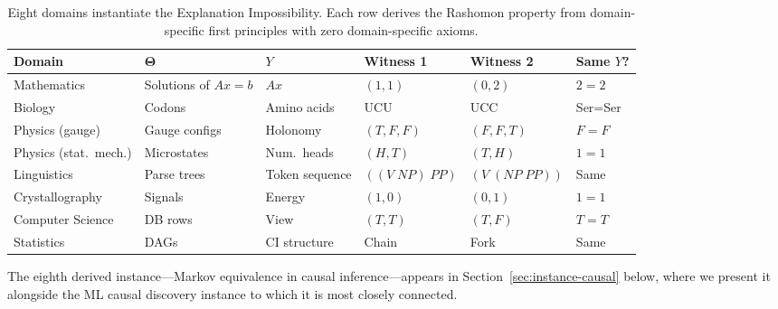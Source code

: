 \documentclass[11pt,a4paper]{article}
\newcommand{\Params}{\mathbf{\Theta}}
\begin{document}
\begin{table}[t]
\centering
\caption{Eight domains instantiate the Explanation Impossibility. Each row derives the Rashomon property from domain-specific first principles with zero domain-specific axioms.}
\label{tab:unification}
\begin{tabular}{llllll}
\toprule
Domain & $\Params$ & $Y$ & Witness 1 & Witness 2 & Same $Y$? \\
\midrule
Mathematics & Solutions of $Ax=b$ & $Ax$ & $(1,1)$ & $(0,2)$ & $2=2$ \\
Biology & Codons & Amino acids & UCU & UCC & Ser=Ser \\
Physics (gauge) & Gauge configs & Holonomy & $(T,F,F)$ & $(F,F,T)$ & $F=F$ \\
Physics (stat.\ mech.) & Microstates & Num.\ heads & $(H,T)$ & $(T,H)$ & $1=1$ \\
Linguistics & Parse trees & Token sequence & $((V\;NP)\;PP)$ & $(V\;(NP\;PP))$ & Same \\
Crystallography & Signals & Energy & $(1,0)$ & $(0,1)$ & $1=1$ \\
Computer Science & DB rows & View & $(T,T)$ & $(T,F)$ & $T=T$ \\
Statistics & DAGs & CI structure & Chain & Fork & Same \\
\bottomrule
\end{tabular}
\end{table}















The eighth derived instance---Markov equivalence in causal inference---appears
in Section~\ref{sec:instance-causal} below, where we present it alongside
the ML causal discovery instance to which it is most closely connected.
\end{document}
